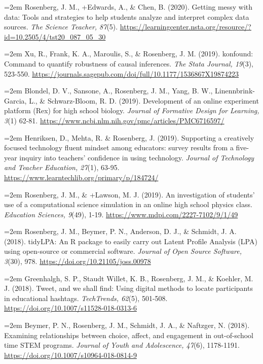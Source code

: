 \documentclass[
  14,
]{article}
\begin{document}
\hangindent=2em Rosenberg, J. M., +Edwards, A., \& Chen, B. (2020).
Getting messy with data: Tools and strategies to help students analyze
and interpret complex data sources. \emph{The Science Teacher, 87}(5).
\url{https://learningcenter.nsta.org/resource/?id=10.2505/4/tst20_087_05_30}

\hangindent=2em Xu, R., Frank, K. A., Maroulis, S., \& Rosenberg, J. M.
(2019). konfound: Command to quantify robustness of causal inferences.
\emph{The Stata Journal, 19}(3), 523-550.
\url{https://journals.sagepub.com/doi/full/10.1177/1536867X19874223}

\hangindent=2em Blondel, D. V., Sansone, A., Rosenberg, J. M., Yang, B.
W., Linennbrink-Garcia, L., \& Schwarz-Bloom, R. D. (2019). Development
of an online experiment platform (Rex) for high school biology.
\emph{Journal of Formative Design for Learning, 3}(1) 62-81.
\url{https://www.ncbi.nlm.nih.gov/pmc/articles/PMC6716597/}

\hangindent=2em Henriksen, D., Mehta, R. \& Rosenberg, J. (2019).
Supporting a creatively focused technology fluent mindset among
educators: survey results from a five-year inquiry into teachers'
confidence in using technology. \emph{Journal of Technology and Teacher
Education, 27}(1), 63-95.
\url{https://www.learntechlib.org/primary/p/184724/}

\hangindent=2em Rosenberg, J. M., \& +Lawson, M. J. (2019). An
investigation of students' use of a computational science simulation in
an online high school physics class. \emph{Education Sciences, 9}(49),
1-19. \url{https://www.mdpi.com/2227-7102/9/1/49}

\hangindent=2em Rosenberg, J. M., Beymer, P. N., Anderson, D. J., \&
Schmidt, J. A. (2018). tidyLPA: An R package to easily carry out Latent
Profile Analysis (LPA) using open-source or commercial software.
\emph{Journal of Open Source Software, 3}(30), 978.
\url{https://doi.org/10.21105/joss.00978}

\hangindent=2em Greenhalgh, S. P., Staudt Willet, K. B., Rosenberg, J.
M., \& Koehler, M. J. (2018). Tweet, and we shall find: Using digital
methods to locate participants in educational hashtags.
\emph{TechTrends, 62}(5), 501-508.
\url{https://doi.org/10.1007/s11528-018-0313-6}

\hangindent=2em Beymer, P. N., Rosenberg, J. M., Schmidt, J. A., \&
Naftzger, N. (2018). Examining relationships between choice, affect, and
engagement in out-of-school time STEM programs. \emph{Journal of Youth
and Adolescence, 47}(6), 1178-1191.
\url{https://doi.org/10.1007/s10964-018-0814-9}
\end{document}

